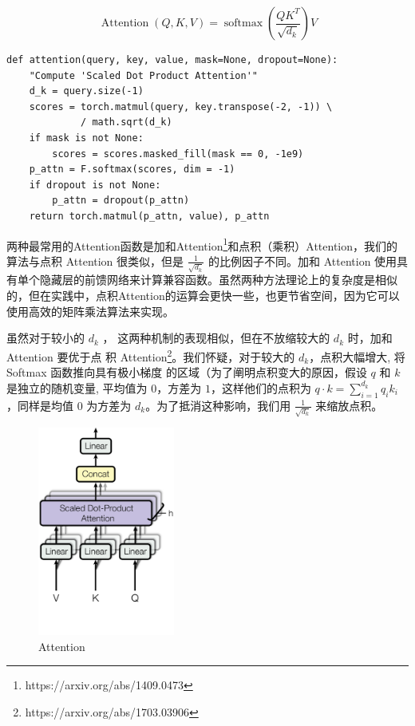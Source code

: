 \begin{equation}
\operatorname{Attention}(Q, K, V)=\operatorname{softmax}\left(\frac{Q K^{T}}{\sqrt{d_{k}}}\right) V
\end{equation}

\begin{Verbatim}
def attention(query, key, value, mask=None, dropout=None):
    "Compute 'Scaled Dot Product Attention'"
    d_k = query.size(-1)
    scores = torch.matmul(query, key.transpose(-2, -1)) \
             / math.sqrt(d_k)
    if mask is not None:
        scores = scores.masked_fill(mask == 0, -1e9)
    p_attn = F.softmax(scores, dim = -1)
    if dropout is not None:
        p_attn = dropout(p_attn)
    return torch.matmul(p_attn, value), p_attn
\end{Verbatim}

两种最常用的Attention函数是加和Attention\footnote{https://arxiv.org/abs/1409.0473}和点积（乘积）Attention，我们的算法与点积 Attention 很类似，但是 $\frac{1}{\sqrt{d_k}}$ 的比例因子不同。加和 Attention 使用具有单个隐藏层的前馈网络来计算兼容函数。虽然两种方法理论上的复杂度是相似的，但在实践中，点积Attention的运算会更快一些，也更节省空间，因为它可以使用高效的矩阵乘法算法来实现。

虽然对于较小的 $d_k$ ， 这两种机制的表现相似，但在不放缩较大的 $d_k$ 时，加和 Attention 要优于点 积 Attention\footnote{https://arxiv.org/abs/1703.03906}。我们怀疑，对于较大的 $d_k$，点积大幅增大, 将 Softmax 函数推向具有极小梯度 的区域（为了阐明点积变大的原因，假设 $q$ 和 $k$ 是独立的随机变量, 平均值为 $0$，方差为 $1$，这样他们的点积为 $q \cdot k=\sum_{i=1}^{d_{k}} q_{i} k_{i}$，同样是均值 $0$ 为方差为 $d_k$。为了抵消这种影响，我们用 $\frac{1}{\sqrt{d_k}}$ 来缩放点积。

\begin{figure}[htb]
\centering 
\includegraphics[width=0.4\textwidth]{img/n4.png} 
\caption{Attention}
\label{Test}
\end{figure}

